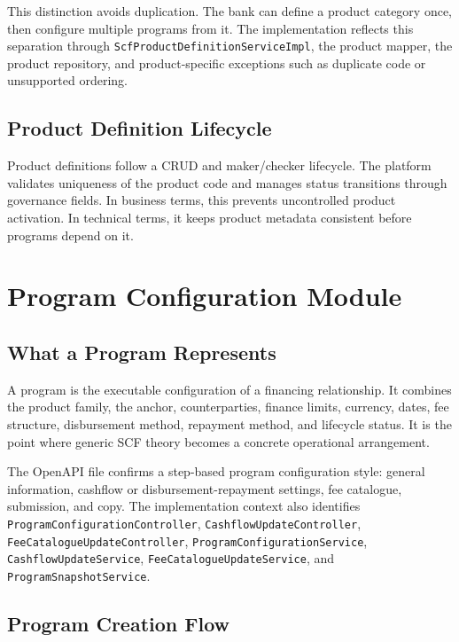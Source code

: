 This distinction avoids duplication. The bank can define a product category once, then configure multiple programs from it. The implementation reflects this separation through \texttt{ScfProductDefinitionServiceImpl}, the product mapper, the product repository, and product-specific exceptions such as duplicate code or unsupported ordering.

\subsection{Product Definition Lifecycle}
\label{subsec:product_definition_lifecycle}

Product definitions follow a CRUD and maker/checker lifecycle. The platform validates uniqueness of the product code and manages status transitions through governance fields. In business terms, this prevents uncontrolled product activation. In technical terms, it keeps product metadata consistent before programs depend on it.

\section{Program Configuration Module}
\label{sec:program_configuration_module}

\subsection{What a Program Represents}
\label{subsec:program_represents}

A program is the executable configuration of a financing relationship. It combines the product family, the anchor, counterparties, finance limits, currency, dates, fee structure, disbursement method, repayment method, and lifecycle status. It is the point where generic SCF theory becomes a concrete operational arrangement.

The OpenAPI file confirms a step-based program configuration style: general information, cashflow or disbursement-repayment settings, fee catalogue, submission, and copy. The implementation context also identifies \texttt{ProgramConfigurationController}, \texttt{CashflowUpdateController}, \texttt{FeeCatalogueUpdateController}, \texttt{ProgramConfigurationService}, \texttt{CashflowUpdateService}, \texttt{FeeCatalogueUpdateService}, and \texttt{ProgramSnapshotService}.

\subsection{Program Creation Flow}
\label{subsec:program_creation_flow}


